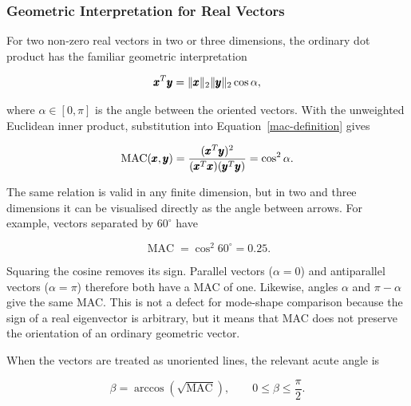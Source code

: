 \subsubsection{Geometric Interpretation for Real Vectors}

For two non-zero real vectors in two or three dimensions, the ordinary dot
product has the familiar geometric interpretation

\begin{equation}\label{vector-angle-definition}
    \pmb{x}^{T}\pmb{y}
    = \| {\pmb{x}} \|_2\| {\pmb{y}} \|_2\cos\alpha,
\end{equation}

where $\alpha\in[0,\pi]$ is the angle between the oriented vectors. With the
unweighted Euclidean inner product, substitution into
Equation~\ref{mac-definition} gives

\begin{bbox}
    \begin{equation}\label{mac-cosine-angle}
        \operatorname{MAC}(\pmb{x},\pmb{y})
        =
        \frac{(\pmb{x}^{T}\pmb{y})^2}
        {(\pmb{x}^{T}\pmb{x})(\pmb{y}^{T}\pmb{y})}
        = \cos^2\alpha.
    \end{equation}
\end{bbox}

The same relation is valid in any finite dimension, but in two and three
dimensions it can be visualised directly as the angle between arrows. For
example, vectors separated by $60^\circ$ have

\begin{equation}
    \operatorname{MAC}=\cos^2 60^\circ=0.25.
\end{equation}

Squaring the cosine removes its sign. Parallel vectors
($\alpha=0$) and antiparallel vectors ($\alpha=\pi$) therefore both have a MAC
of one. Likewise, angles $\alpha$ and $\pi-\alpha$ give the same MAC. This is
not a defect for mode-shape comparison because the sign of a real eigenvector
is arbitrary, but it means that MAC does not preserve the orientation of an
ordinary geometric vector.

When the vectors are treated as unoriented lines, the relevant acute angle is

\begin{bbox}
    \begin{equation}\label{mac-principal-angle}
        \beta
        = \arccos\!\left(\sqrt{\operatorname{MAC}}\right),
        \qquad 0\leq\beta\leq\frac{\pi}{2}.
    \end{equation}
\end{bbox}

